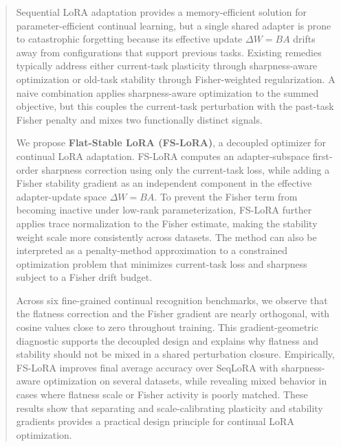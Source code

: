 \begin{abstract}
Sequential LoRA adaptation provides a memory-efficient solution for parameter-efficient continual learning, but a single shared adapter is prone to catastrophic forgetting because its effective update $\Delta W=BA$ drifts away from configurations that support previous tasks. Existing remedies typically address either current-task plasticity through sharpness-aware optimization or old-task stability through Fisher-weighted regularization. A naive combination applies sharpness-aware optimization to the summed objective, but this couples the current-task perturbation with the past-task Fisher penalty and mixes two functionally distinct signals.

We propose \textbf{Flat-Stable LoRA (FS-LoRA)}, a decoupled optimizer for continual LoRA adaptation. FS-LoRA computes an adapter-subspace first-order sharpness correction using only the current-task loss, while adding a Fisher stability gradient as an independent component in the effective adapter-update space $\Delta W=BA$. To prevent the Fisher term from becoming inactive under low-rank parameterization, FS-LoRA further applies trace normalization to the Fisher estimate, making the stability weight scale more consistently across datasets. The method can also be interpreted as a penalty-method approximation to a constrained optimization problem that minimizes current-task loss and sharpness subject to a Fisher drift budget.

Across six fine-grained continual recognition benchmarks, we observe that the flatness correction and the Fisher gradient are nearly orthogonal, with cosine values close to zero throughout training. This gradient-geometric diagnostic supports the decoupled design and explains why flatness and stability should not be mixed in a shared perturbation closure. Empirically, FS-LoRA improves final average accuracy over SeqLoRA with sharpness-aware optimization on several datasets, while revealing mixed behavior in cases where flatness scale or Fisher activity is poorly matched. These results show that separating and scale-calibrating plasticity and stability gradients provides a practical design principle for continual LoRA optimization.
\end{abstract}